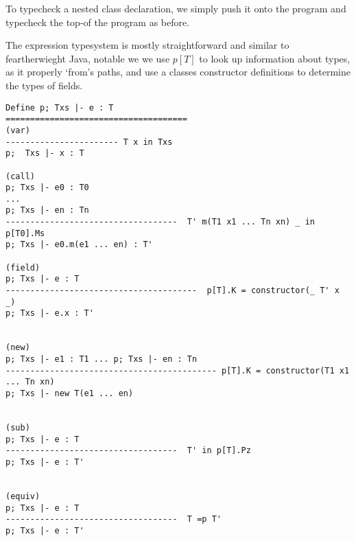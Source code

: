 To typecheck a nested class declaration, we simply push it onto the program and typecheck the top-of the program as before.


The expression typesystem is mostly straightforward and similar to feartherwieght Java, notable we we use $p[T]$ to look up information about types, as it properly ‘from’s paths, and use a classes constructor definitions to determine the types of fields.

\begin{verbatim}
Define p; Txs |- e : T
=====================================
(var)
----------------------- T x in Txs
p;  Txs |- x : T

(call)
p; Txs |- e0 : T0
...
p; Txs |- en : Tn
-----------------------------------  T' m(T1 x1 ... Tn xn) _ in p[T0].Ms
p; Txs |- e0.m(e1 ... en) : T'

(field)
p; Txs |- e : T
---------------------------------------  p[T].K = constructor(_ T' x _)
p; Txs |- e.x : T'


(new)
p; Txs |- e1 : T1 ... p; Txs |- en : Tn
------------------------------------------- p[T].K = constructor(T1 x1 ... Tn xn)
p; Txs |- new T(e1 ... en)


(sub)
p; Txs |- e : T
-----------------------------------  T' in p[T].Pz
p; Txs |- e : T'


(equiv)
p; Txs |- e : T
-----------------------------------  T =p T'
p; Txs |- e : T'
\end{verbatim}